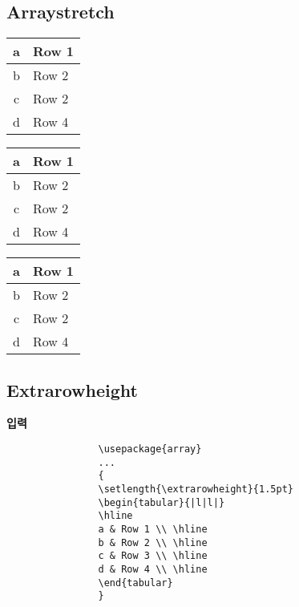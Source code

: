	\subsection{Arraystretch}
		{
		\renewcommand{\arraystretch}{1.0}
		\begin{tabular}{|c|l|}
		\hline
		a & Row 1 \\ \hline
		b & Row 2 \\ \hline
		c & Row 2 \\ \hline
		d & Row 4 \\ \hline
		\end{tabular}
		}
		{
		\renewcommand{\arraystretch}{1.2}
		\begin{tabular}{|c|l|}
		\hline
		a & Row 1 \\ \hline
		b & Row 2 \\ \hline
		c & Row 2 \\ \hline
		d & Row 4 \\ \hline
		\end{tabular}
		}
		{
		\renewcommand{\arraystretch}{2.0}
		\begin{tabular}{|c|l|}
		\hline
		a & Row 1 \\ \hline
		b & Row 2 \\ \hline
		c & Row 2 \\ \hline
		d & Row 4 \\ \hline
		\end{tabular}
		}
		
	\clearpage %
	\subsection{Extrarowheight}
	

		\textbf{입력}
		\singlespacing
			\begin{boxedminipage}[t]{1.0\linewidth}
			\begin{verbatim}
				\usepackage{array}
				...
				{
				\setlength{\extrarowheight}{1.5pt}
				\begin{tabular}{|l|l|}
				\hline
				a & Row 1 \\ \hline
				b & Row 2 \\ \hline
				c & Row 3 \\ \hline
				d & Row 4 \\ \hline
				\end{tabular}
				}
			\end{verbatim} 
			\end{boxedminipage} \\ \\
		\doublespacing

